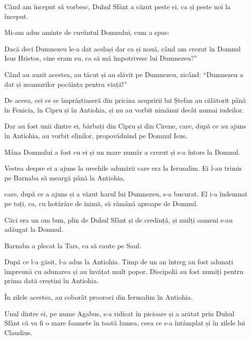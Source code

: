 {Când am început să vorbesc, Duhul Sfânt a căzut peste ei, ca și peste noi la început.

Mi-am adus aminte de cuvântul Domnului, cum a spus:
{}

Dacă deci Dumnezeu le-a dat același dar ca și nouă, când am crezut în Domnul Isus Hristos, cine eram eu, ca să mă împotrivesc lui Dumnezeu?”


\par }{\PP {}Când au auzit acestea, au tăcut și au slăvit pe Dumnezeu, zicând: “Dumnezeu a dat și neamurilor pocăința pentru viață!”


\par }{\PP {}De aceea, cei ce se împrăștiaseră din pricina asupririi lui Ștefan au călătorit până în Fenicia, în Cipru și în Antiohia, și nu au vorbit nimănui decât numai iudeilor.

Dar au fost unii dintre ei, bărbați din Cipru și din Cirene, care, după ce au ajuns în Antiohia, au vorbit elinilor,
propovăduind pe Domnul Isus.

Mâna Domnului a fost cu ei și un mare număr a crezut și s-a întors la Domnul.

Vestea despre ei a ajuns la urechile adunării care era la Ierusalim. Ei l-au trimis pe Barnaba să meargă până la Antiohia,

care, după ce a ajuns și a văzut harul lui Dumnezeu, s-a bucurat. El i-a îndemnat pe toți, ca, cu hotărâre de inimă, să rămână aproape de Domnul.

Căci era un om bun, plin de Duhul Sfânt și de credință, și mulți oameni s-au adăugat la Domnul.


\par }{\PP {}Barnaba a plecat la Tars, ca să caute pe Saul.

După ce l-a găsit, l-a adus la Antiohia. Timp de un an întreg au fost adunați împreună cu adunarea și au învățat mult popor. Discipolii au fost numiți pentru prima dată creștini în Antiohia.


\par }{\PP {}În zilele acestea, au coborât prooroci din Ierusalim în Antiohia.

Unul dintre ei, pe nume Agabus, s-a ridicat în picioare și a arătat prin Duhul Sfânt că va fi o mare foamete în toată lumea, ceea ce s-a întâmplat și în zilele lui Claudius.

}
